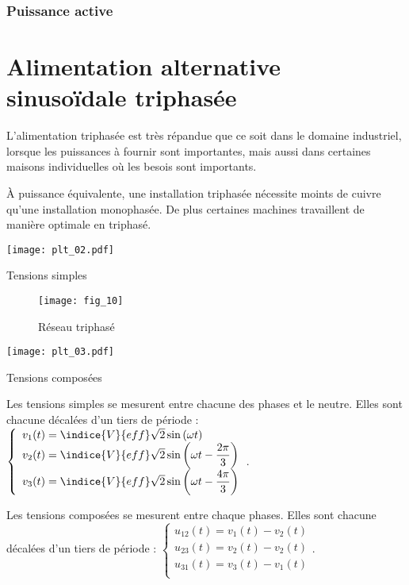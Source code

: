 \subsubsection{Puissance active}


\section{Alimentation alternative sinusoïdale triphasée}
L'alimentation triphasée est très répandue que ce soit dans le domaine industriel, lorsque les puissances à fournir sont importantes, mais aussi dans certaines maisons individuelles où les besois sont importants.

À puissance équivalente, une installation triphasée nécessite moints de cuivre qu'une installation monophasée. De plus certaines machines travaillent de manière optimale en triphasé. 

\begin{marginfigure}
\centering
\texttt{[image: plt\_02.pdf]}
\caption{Tensions simples \label{fig:ge:cours:plt:02}}
\end{marginfigure}

\begin{figure}[!h]
\centering
\texttt{[image: fig\_10]}
\caption{Réseau triphasé \label{fig:ge:cours:&0}}
\end{figure}

\begin{marginfigure}
\centering
\texttt{[image: plt\_03.pdf]}
\caption{Tensions composées \label{fig:ge:cours:plt:03}}
\end{marginfigure}

Les tensions simples se mesurent entre chacune des phases et le neutre. 
Elles sont chacune décalées d'un tiers de période : 
$\left\{ 
\begin{array}{l}
v_1(t)  = \indice{V}{eff} \sqrt{2} \sin \left(\omega t\right) \\
v_2(t)  = \indice{V}{eff} \sqrt{2} \sin \left(\omega t - \dfrac{2\pi}{3}\right) \\
v_3(t)  = \indice{V}{eff} \sqrt{2} \sin \left(\omega t - \dfrac{4\pi}{3} \right) \\
\end{array}
\right.
$.



Les tensions composées se mesurent entre chaque phases. Elles sont chacune décalées d'un tiers de période : 
$\left\{ 
\begin{array}{l}
u_{12}(t)  = v_1(t) - v_2(t) \\
u_{23}(t)  = v_2(t) - v_2(t) \\
u_{31}(t)  = v_3(t) - v_1(t) \\
\end{array}
\right.
$.



